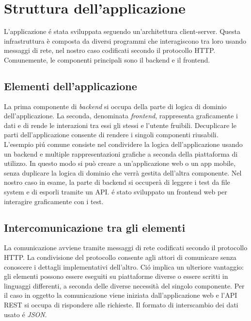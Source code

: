 \chapter{Struttura dell'applicazione}
    L'applicazione \'e stata sviluppata seguendo un'architettura client-server.
    Questa infrastruttura è composta da diversi programmi che interagiscono tra loro usando messaggi di rete, nel nostro caso codificati secondo il protocollo HTTP.
    Comunemente, le componenti principali sono il backend e il frontend.    

    \section{Elementi dell'applicazione}
        La prima componente di \textit{backend} si occupa della parte di logica di dominio dell'applicazione.
        La seconda, denominata \textit{frontend}, rappresenta graficamente i dati e di rende le interazioni tra essi gli stessi e l'utente fruibili.
        Decuplicare le parti dell'applicazione consente di rendere i singoli componenti riusabili.
        L'esempio pi\'u comune consiste nel condividere la logica dell'applicazione usando un backend e multiple rappresentazioni grafiche a seconda della piattaforma di utilizzo.
        In questo modo si può creare a un'applicazione web o un app mobile, senza duplicare la logica di dominio che verrà gestita dell'altra componente.
        Nel nostro caso in esame, la parte di backend si occuperà di leggere i test da file system e di esporli tramite un API.
        \'e stato sviluppato un frontend web per interagire graficamente con i test.

    \section{Intercomunicazione tra gli elementi}
        La comunicazione avviene tramite messaggi di rete codificati secondo il protocollo HTTP.
        La condivisione del protocollo consente agli attori di comunicare senza conoscere i dettagli implementativi dell'altro.
        Ci\'o implica un ulteriore vantaggio: gli elementi possono essere eseguiti su piattaforme diverse o essere scritti in linguaggi differenti, a seconda delle diverse necessità del singolo componente.
        Per il caso in oggetto la comunicazione viene iniziata dall'applicazione web e l'API REST si occupa di rispondere alle richieste.
        Il formato di interscambio dei dati usato \'e \textit{JSON}.

